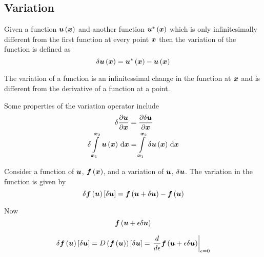 
\subsection{Variation}
\label{subsec:VariationOperator}

Given a function $  \boldsymbol{u} \left(  \boldsymbol{x}  \right) $  and another function
$  \boldsymbol{u} ^{*}\left(  \boldsymbol{x}  \right) $ which is only infinitesimally different from
the first function at every point $ \boldsymbol{x} $ then the variation of the
function is defined as
\begin{equation}
     \delta   \boldsymbol{u}  \left(  \boldsymbol{x}  \right) =  \boldsymbol{u} ^{*}\left(  \boldsymbol{x}  \right) -  \boldsymbol{u} \left(  \boldsymbol{x}  \right) 
\end{equation}

The variation of a function is an infinitessimal change in the function at
$ \boldsymbol{x} $ and is different from the derivative of a function at a point.

Some properties of the variation operator include
\begin{equation}
  \begin{split}
    \variationdir{\delby{\vectr{u}}{\vectr{x}}}&=\delby{\variationdir{\vectr{u}}}{\vectr{x}} \\
    \variationdir{\gint{\vectr{x}_{1}}{\vectr{x}_{2}}{\fnof{\vectr{u}}{\vectr{x}}}{\vectr{x}}}&=\gint{\vectr{x}_{1}}{\vectr{x}_{2}}{\variationdir{\fnof{\vectr{u}}{\vectr{x}}}}{\vectr{x}} 
  \end{split}
\end{equation}

Consider a function of $ \boldsymbol{u} $, $  \boldsymbol{f} \left(  \boldsymbol{x}  \right) $, and a
variation of $ \boldsymbol{u} $, $  \delta   \boldsymbol{u}  $. The variation in the
function is given by
\begin{equation}
     \delta    \boldsymbol{f} \left(  \boldsymbol{u}  \right) \left[   \delta   \boldsymbol{u}   \right]  =  \boldsymbol{f} \left(  \boldsymbol{u} +  \delta   \boldsymbol{u}   \right) -  \boldsymbol{f} \left(  \boldsymbol{u}  \right) 
\end{equation}

Now
\begin{equation}
    \boldsymbol{f} \left(  \boldsymbol{u} +\epsilon  \delta   \boldsymbol{u}   \right) 
\end{equation}

\begin{equation}
  \variation{\fnof{\vectr{f}}{\vectr{u}}}{\vectr{u}}=\directionalderiv{}{\fnof{\vectr{f}}{\vectr{u}}}{\variationdir{\vectr{u}}}=\evalat{\dby{}{\epsilon}\fnof{\vectr{f}}{\vectr{u}+\epsilon\variationdir{\vectr{u}}}}{\epsilon=0}
\end{equation}
  
